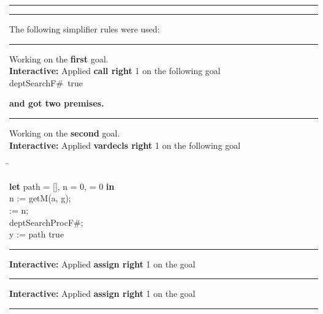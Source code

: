 \documentclass[a4paper]{article}
\begin{document}
\rule{1\textwidth}{1ex}



\rule{1\textwidth}{1ex}


The following simplifier rules were used:


\rule{1\textwidth}{1ex}


Working on the {\bf first} goal.\\
{\bf Interactive:} Applied {\bf call right} 1 on the following goal \\


 \Fol \Do deptSearchF\#\Dc\ true





{\bf and got two premises.}\\


\rule{1\textwidth}{1mm}


Working on the {\bf second} goal.\\
{\bf Interactive:} Applied {\bf vardecls right} 1 on the following goal \\


\begin{flushleft}


\Fol


\begin{tabbing}
\Do\= \+

{\bf let} path = [], n = 0,  = 0 {\bf in} \\ 
n := getM(a, g); \\ 
  := n; \\ 
 deptSearchProcF\#; \\ 
 y := path\Dc\-
true
\end{tabbing}


\end{flushleft}




\rule{1\textwidth}{1mm}


{\bf Interactive:} Applied {\bf assign right} 1 on the goal \\
\rule{1\textwidth}{1mm}


{\bf Interactive:} Applied {\bf assign right} 1 on the goal \\
\rule{1\textwidth}{1mm}
\end{document}
